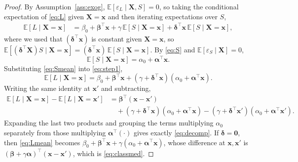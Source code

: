 \documentclass{amsart}
\theoremstyle{definition}
\theoremstyle{plain}
\begin{document}
\begin{proof}
By Assumption~\ref{ass:exog}, $\mathbb E[\varepsilon_L\mid \bm X,S]=0$, so taking the
conditional expectation of \eqref{eq:L} given $\bm X=\bm x$ and then iterating expectations
over $S$,
\begin{align}
\mathbb E[L\mid \bm X=\bm x]
&=\beta_0+\bm\beta^\top\bm x+\gamma\,\mathbb E[S\mid \bm X=\bm x]
   +\bm\delta^\top\bm x\,\mathbb E[S\mid \bm X=\bm x],\label{eq:step1}
\end{align}
where we used that $(\bm\delta^\top\bm x)$ is constant given $\bm X=\bm x$, so
$\mathbb E[(\bm\delta^\top\bm X)S\mid \bm X=\bm x]=(\bm\delta^\top\bm x)\,
\mathbb E[S\mid \bm X=\bm x]$.
By \eqref{eq:S} and $\mathbb E[\varepsilon_S\mid \bm X]=0$,
\begin{equation}\label{eq:Smean}
\mathbb E[S\mid \bm X=\bm x]=\alpha_0+\bm\alpha^\top\bm x.
\end{equation}
Substituting \eqref{eq:Smean} into \eqref{eq:step1},
\begin{equation}\label{eq:Lmean}
\mathbb E[L\mid \bm X=\bm x]
=\beta_0+\bm\beta^\top\bm x+(\gamma+\bm\delta^\top\bm x)(\alpha_0+\bm\alpha^\top\bm x).
\end{equation}
Writing the same identity at $\bm x'$ and subtracting,
\begin{align*}
\mathbb E[L\mid \bm X=\bm x]-\mathbb E[L\mid \bm X=\bm x']
&=\bm\beta^\top(\bm x-\bm x')\\
&\quad+(\gamma+\bm\delta^\top\bm x)(\alpha_0+\bm\alpha^\top\bm x)
       -(\gamma+\bm\delta^\top\bm x')(\alpha_0+\bm\alpha^\top\bm x').
\end{align*}
Expanding the last two products and grouping the terms multiplying $\alpha_0$ separately
from those multiplying $\bm\alpha^\top(\cdot)$ gives exactly \eqref{eq:decomp}.
If $\bm\delta=\bm 0$, then \eqref{eq:Lmean} becomes
$\beta_0+\bm\beta^\top\bm x+\gamma(\alpha_0+\bm\alpha^\top\bm x)$, whose difference at
$\bm x,\bm x'$ is $(\bm\beta+\gamma\bm\alpha)^\top(\bm x-\bm x')$, which is
\eqref{eq:classmed}.
\end{proof}
\end{document}

